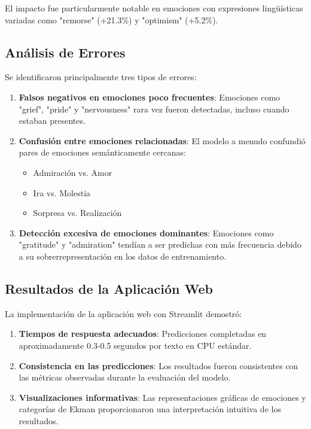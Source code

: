 \documentclass[12pt,a4paper]{report}
\begin{document}
El impacto fue particularmente notable en emociones con expresiones lingüísticas variadas como "remorse" (+21.3\%) y "optimism" (+5.2\%).

\subsection{Análisis de Errores}

Se identificaron principalmente tres tipos de errores:

\begin{enumerate}
  \item \textbf{Falsos negativos en emociones poco frecuentes}: Emociones como "grief", "pride" y "nervousness" rara vez fueron detectadas, incluso cuando estaban presentes.

  \item \textbf{Confusión entre emociones relacionadas}: El modelo a menudo confundió pares de emociones semánticamente cercanas:
  \begin{itemize}
    \item Admiración vs. Amor
    \item Ira vs. Molestia
    \item Sorpresa vs. Realización
  \end{itemize}

  \item \textbf{Detección excesiva de emociones dominantes}: Emociones como "gratitude" y "admiration" tendían a ser predichas con más frecuencia debido a su sobrerrepresentación en los datos de entrenamiento.
\end{enumerate}

\subsection{Resultados de la Aplicación Web}

La implementación de la aplicación web con Streamlit demostró:

\begin{enumerate}
  \item \textbf{Tiempos de respuesta adecuados}: Predicciones completadas en aproximadamente 0.3-0.5 segundos por texto en CPU estándar.

  \item \textbf{Consistencia en las predicciones}: Los resultados fueron consistentes con las métricas observadas durante la evaluación del modelo.

  \item \textbf{Visualizaciones informativas}: Las representaciones gráficas de emociones y categorías de Ekman proporcionaron una interpretación intuitiva de los resultados.
\end{enumerate}
\end{document}

